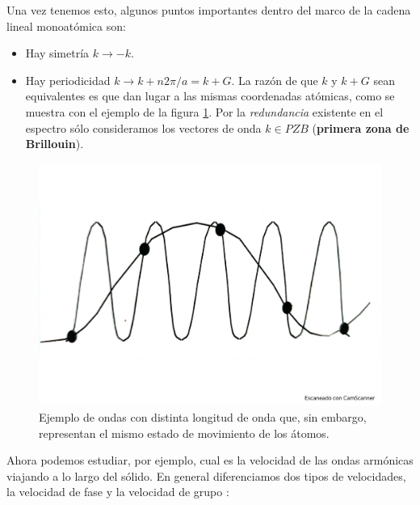 Una vez tenemos esto, algunos puntos importantes dentro del marco de la cadena lineal monoatómica son:

\begin{itemize}
	\item Hay simetría $k\rightarrow -k$.
	\item Hay periodicidad $k\rightarrow k+n2\pi/a=k+G$. La razón de que $k$ y $k+G$ sean equivalentes es que dan lugar a las mismas coordenadas atómicas, como se muestra con el ejemplo de la figura \ref{Fig:04-03}. Por la \textit{redundancia} existente en el espectro sólo consideramos los vectores de onda $k \in PZB$ (\textbf{primera zona de Brillouin}).
\end{itemize}

\begin{figure}[h!] \centering
    \includegraphics[scale=0.27]{Cuerpo/Ch_04/Fotos libro 3.pdf}
    \caption{Ejemplo de ondas con distinta longitud de onda que, sin embargo, representan el mismo estado de movimiento de los átomos.}
    \label{Fig:04-03}
\end{figure}    

Ahora podemos estudiar, por ejemplo, cual es la velocidad de las ondas armónicas viajando a lo largo del sólido. En general diferenciamos dos tipos de velocidades, la velocidad de fase y la velocidad de grupo \cite{Oxford_Solid_State}:

